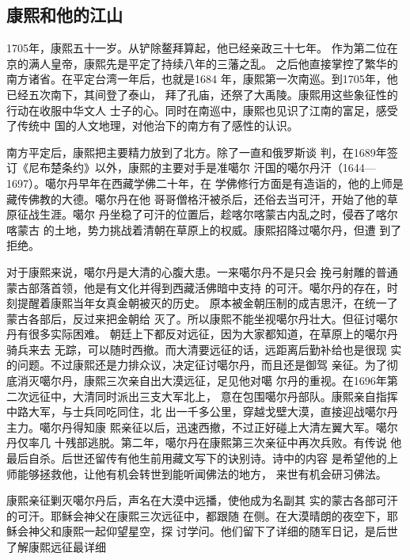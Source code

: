 \subsection{康熙和他的江山}
\par
1705年，康熙五十一岁。从铲除鳌拜算起，他已经亲政三十七年。%
作为第二位在京的满人皇帝，康熙先是平定了持续八年的三藩之乱。%
之后他直接掌控了繁华的南方诸省。在平定台湾一年后，也就是1684%
年，康熙第一次南巡。到1705年，他已经五次南下，其间登了泰山，%
拜了孔庙，还祭了大禹陵。康熙用这些象征性的行动在收服中华文人%
士子的心。同时在南巡中，康熙也见识了江南的富足，感受了传统中%
国的人文地理，对他治下的南方有了感性的认识。%
\par
南方平定后，康熙把主要精力放到了北方。除了一直和俄罗斯谈%
判，在1689年签订《尼布楚条约》以外，康熙的主要对手是准噶尔%
汗国的噶尔丹汗（1644—1697）。噶尔丹早年在西藏学佛二十年，在%
学佛修行方面是有造诣的，他的上师是藏传佛教的大德。噶尔丹在他%
哥哥僧格汗被杀后，还俗去当可汗，开始了他的草原征战生涯。噶尔%
丹坐稳了可汗的位置后，趁喀尔喀蒙古内乱之时，侵吞了喀尔喀蒙古%
的土地，势力挑战着清朝在草原上的权威。康熙招降过噶尔丹，但遭%
到了拒绝。%
\par
对于康熙来说，噶尔丹是大清的心腹大患。一来噶尔丹不是只会%
挽弓射雕的普通蒙古部落首领，他是有文化并得到西藏活佛暗中支持%
的可汗。噶尔丹的存在，时刻提醒着康熙当年女真金朝被灭的历史。%
原本被金朝压制的成吉思汗，在统一了蒙古各部后，反过来把金朝给%
灭了。所以康熙不能坐视噶尔丹壮大。但征讨噶尔丹有很多实际困难。%
朝廷上下都反对远征，因为大家都知道，在草原上的噶尔丹骑兵来去%
无踪，可以随时西撤。而大清要远征的话，远距离后勤补给也是很现%
实的问题。不过康熙还是力排众议，决定征讨噶尔丹，而且还是御驾%
亲征。为了彻底消灭噶尔丹，康熙三次亲自出大漠远征，足见他对噶%
尔丹的重视。在1696年第二次远征中，大清同时派出三支大军北上，%
意在包围噶尔丹部队。康熙亲自指挥中路大军，与士兵同吃同住，北%
出一千多公里，穿越戈壁大漠，直接迎战噶尔丹主力。噶尔丹得知康%
熙亲征以后，迅速西撤，不过正好碰上大清左翼大军。噶尔丹仅率几%
十残部逃脱。第二年，噶尔丹在康熙第三次亲征中再次兵败。有传说%
他最后自杀。后世还留传有他生前用藏文写下的诀别诗。诗中的内容%
是希望他的上师能够拯救他，让他有机会转世到能听闻佛法的地方，%
来世有机会研习佛法。%
\par
康熙亲征剿灭噶尔丹后，声名在大漠中远播，使他成为名副其%
实的蒙古各部可汗的可汗。耶稣会神父在康熙三次远征中，都跟随%
在侧。在大漠晴朗的夜空下，耶稣会神父和康熙一起仰望星空，探%
讨学问。他们留下了详细的随军日记，是后世了解康熙远征最详细%
